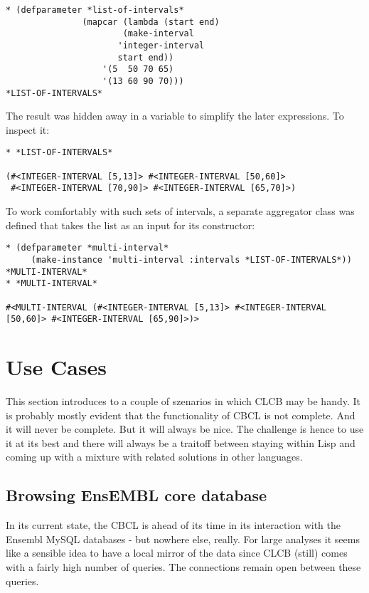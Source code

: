 \documentclass{book}
\newcommand\ensembl{EnsEMBL }
\newcommand\CLCB{CLCB }
\begin{document}
\begin{lstlisting}
* (defparameter *list-of-intervals*
               (mapcar (lambda (start end)
		               (make-interval
			          'integer-interval
			          start end))
	               '(5  50 70 65)
           	       '(13 60 90 70)))
*LIST-OF-INTERVALS*
\end{lstlisting}

The result was hidden away in a variable to simplify
the later expressions. To inspect it:

\begin{lstlisting}
* *LIST-OF-INTERVALS*

(#<INTEGER-INTERVAL [5,13]> #<INTEGER-INTERVAL [50,60]>
 #<INTEGER-INTERVAL [70,90]> #<INTEGER-INTERVAL [65,70]>)
\end{lstlisting}

To work comfortably with such sets of intervals, a separate
aggregator class was defined that takes the list as an input
for its constructor:

\begin{lstlisting}
* (defparameter *multi-interval*
     (make-instance 'multi-interval :intervals *LIST-OF-INTERVALS*))
*MULTI-INTERVAL*
* *MULTI-INTERVAL*

#<MULTI-INTERVAL (#<INTEGER-INTERVAL [5,13]> #<INTEGER-INTERVAL [50,60]> #<INTEGER-INTERVAL [65,90]>)>

\end{lstlisting}



\chapter{Use Cases}

This section introduces to a couple of szenarios in which \CLCB may
be handy. It is probably mostly evident that the functionality of CBCL
is not complete. And it will never be complete. But it will always be
nice. The challenge is hence to use it at its best and there will always
be a traitoff between staying within Lisp and coming up with a mixture
with related solutions in other languages.

\section{Browsing \ensembl core database}

In its current state, the CBCL is ahead of its time in its interaction with
the Ensembl MySQL databases - but nowhere else, really. For large analyses
it seems like a sensible idea to have a local mirror of the data since
\CLCB (still) comes with a fairly high number of queries. The connections
remain open between these queries.
\end{document}
